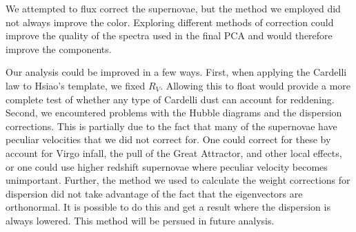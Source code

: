 We attempted to flux correct the supernovae, but the method we employed did not always improve the color. Exploring different methods of correction could improve the quality of the spectra used in the final PCA and would therefore improve the components. 

Our analysis could be improved in a few ways. First, when applying the Cardelli law to Hsiao's template, we fixed $R_{V}$. Allowing this to float would provide a more complete test of whether any type of Cardelli dust can account for reddening.  Second, we encountered problems with the Hubble diagrams and the dispersion corrections. This is partially due to the fact that many of the supernovae have peculiar velocities that we did not correct for. One could correct for these by account for Virgo infall, the pull of the Great Attractor, and other local effects, or one could use higher redshift supernovae where peculiar velocity becomes unimportant. Further, the method we used to calculate the weight corrections for dispersion did not take advantage of the fact that the eigenvectors are orthonormal. It is possible to do this and get a result where the dispersion is always lowered. This method will be persued in future analysis.
